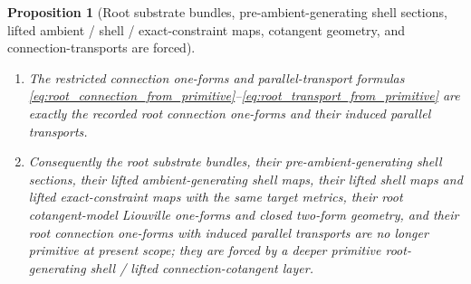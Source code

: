 \documentclass[11pt]{article}
\newtheorem{proposition}{Proposition}
\begin{document}
\begin{proposition}[Root substrate bundles, pre-ambient-generating shell sections, lifted ambient / shell / exact-constraint maps, cotangent geometry, and connection-transports are forced]
\begin{enumerate}
    \item The restricted connection one-forms and parallel-transport formulas \eqref{eq:root_connection_from_primitive}--\eqref{eq:root_transport_from_primitive} are exactly the recorded root connection one-forms and their induced parallel transports.
    \item Consequently the root substrate bundles, their pre-ambient-generating shell sections, their lifted ambient-generating shell maps, their lifted shell maps and lifted exact-constraint maps with the same target metrics, their root cotangent-model Liouville one-forms and closed two-form geometry, and their root connection one-forms with induced parallel transports are no longer primitive at present scope; they are forced by a deeper primitive root-generating shell / lifted connection-cotangent layer.
\end{enumerate}
\end{proposition}
\end{document}
